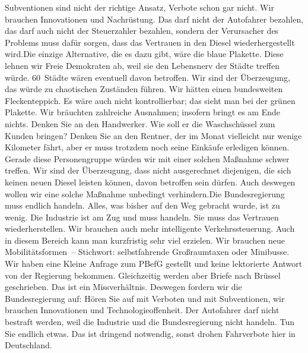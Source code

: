 \documentclass{article}
\begin{document}
Subventionen sind nicht der richtige Ansatz, Verbote schon gar nicht. Wir brauchen Innovationen und Nachrüstung. Das darf nicht der Autofahrer bezahlen, das darf auch nicht der Steuerzahler bezahlen, sondern der Verursacher des Problems muss dafür sorgen, dass das Vertrauen in den Diesel wiederhergestellt wird.Die einzige Alternative, die es dazu gibt, wäre die blaue Plakette. Diese lehnen wir Freie Demokraten ab, weil sie den Lebensnerv der Städte treffen würde. 60 Städte wären eventuell davon betroffen. Wir sind der Überzeugung, das würde zu chaotischen Zuständen führen. Wir hätten einen bundesweiten Fleckenteppich. Es wäre auch nicht kontrollierbar; das sieht man bei der grünen Plakette. Wir bräuchten zahlreiche Ausnahmen; insofern bringt es am Ende nichts. Denken Sie an den Handwerker. Wie soll er die Waschschüssel zum Kunden bringen? Denken Sie an den Rentner, der im Monat vielleicht nur wenige Kilometer fährt, aber er muss trotzdem noch seine Einkäufe erledigen können. Gerade diese Personengruppe würden wir mit einer solchen Maßnahme schwer treffen. Wir sind der Überzeugung, dass nicht ausgerechnet diejenigen, die sich keinen neuen Diesel leisten können, davon betroffen sein dürfen. Auch deswegen wollen wir eine solche Maßnahme unbedingt verhindern.Die Bundesregierung muss endlich handeln. Alles, was bisher auf den Weg gebracht wurde, ist zu wenig. Die Industrie ist am Zug und muss handeln. Sie muss das Vertrauen wiederherstellen. Wir brauchen auch mehr intelligente Verkehrssteuerung. Auch in diesem Bereich kann man kurzfristig sehr viel erzielen. Wir brauchen neue Mobilitätsformen – Stichwort: selbstfahrende Großraumtaxen oder Minibusse. Wir haben eine Kleine Anfrage zum PBefG gestellt und keine lektorierte Antwort von der Regierung bekommen. Gleichzeitig werden aber Briefe nach Brüssel geschrieben. Das ist ein Missverhältnis. Deswegen fordern wir die Bundesregierung auf: Hören Sie auf mit Verboten und mit Subventionen, wir brauchen Innovationen und Technologieoffenheit. Der Autofahrer darf nicht bestraft werden, weil die Industrie und die Bundesregierung nicht handeln. Tun Sie endlich etwas. Das ist dringend notwendig, sonst drohen Fahrverbote hier in Deutschland.
\end{document}
